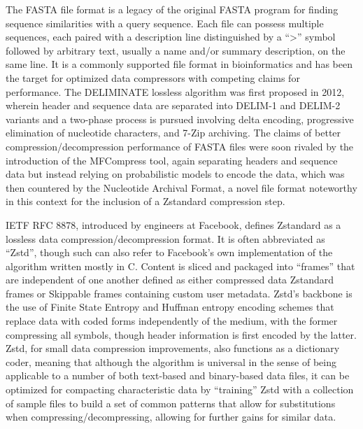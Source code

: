 \documentclass[
  10pt,
  letterpaper,
]{article}
\begin{document}
The FASTA file format is a legacy of the original FASTA program for
finding sequence similarities with a query
sequence\citep{lipman1985rapid}. Each file can possess multiple
sequences, each paired with a description line distinguished by a
``\textgreater{}'' symbol followed by arbitrary text, usually a name
and/or summary description, on the same line. It is a commonly supported
file format in bioinformatics and has been the target for optimized data
compressors with competing claims for performance. The DELIMINATE
lossless algorithm was first proposed in 2012, wherein header and
sequence data are separated into DELIM-1 and DELIM-2 variants and a
two-phase process is pursued involving delta encoding, progressive
elimination of nucleotide characters, and 7-Zip
archiving\citep{mohammed2012deliminate}. The claims of better
compression/decompression performance of FASTA files were soon rivaled
by the introduction of the MFCompress tool, again separating headers and
sequence data but instead relying on probabilistic models to encode the
data\citep{pinho2014mfcompress}, which was then countered by the
Nucleotide Archival Format, a novel file format noteworthy in this
context for the inclusion of a Zstandard compression
step\citep{kryukov2019nucleotide}.

IETF RFC 8878, introduced by engineers at Facebook, defines Zstandard as
a lossless data compression/decompression
format\citep{collet2021rfc8478}. It is often abbreviated as ``Zstd'',
though such can also refer to Facebook's own implementation of the
algorithm written mostly in C\citep{facebook}. Content is sliced and
packaged into ``frames'' that are independent of one another defined as
either compressed data Zstandard frames or Skippable frames containing
custom user metadata\citep{collet2021rfc8478}. Zstd's backbone is the
use of Finite State Entropy and Huffman entropy encoding schemes that
replace data with coded forms independently of the
medium\citep{ezhilarasan_thambidurai_praveena_srinivasan_sumathi_2007, LU20171},
with the former compressing all symbols, though header information is
first encoded by the latter\citep{collet2021rfc8478}. Zstd, for small
data compression improvements, also functions as a dictionary coder,
meaning that although the algorithm is universal in the sense of being
applicable to a number of both text-based and binary-based data files,
it can be optimized for compacting characteristic data by ``training''
Zstd with a collection of sample files to build a set of common patterns
that allow for substitutions when compressing/decompressing, allowing
for further gains for similar data\citep{8316293}.
\end{document}

